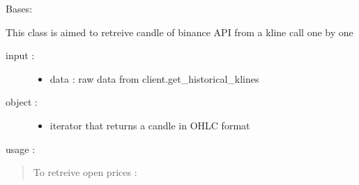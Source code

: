\documentclass[letterpaper,10pt,english]{sphinxmanual}
\begin{document}

\begin{fulllineitems}
\label{\detokenize{my_tools.cryptools:my_tools.cryptools.mock.kline_mock}}
\sphinxAtStartPar
Bases: 

\sphinxAtStartPar
This class is aimed to retreive candle of binance API from a kline call one by one
\begin{description}
\item[{input :}] \leavevmode\begin{itemize}
\item {} 
\sphinxAtStartPar
data : raw data from client.get\_historical\_klines

\end{itemize}

\item[{object :}] \leavevmode\begin{itemize}
\item {} 
\sphinxAtStartPar
iterator that returns a candle in OHLC format

\end{itemize}

\end{description}

\sphinxAtStartPar
usage :
\begin{quote}

\sphinxAtStartPar
To retreive open prices :

\begin{sphinxVerbatim}[commandchars=\\\{\}]
   
    \PYG{p}{[}\PYG{p}{]}
\end{sphinxVerbatim}
\end{quote}

\end{fulllineitems}

\end{document}
